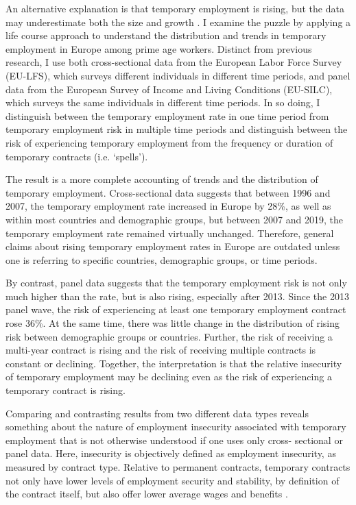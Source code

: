 \documentclass[12pt]{article}
\begin{document}
An alternative explanation is that temporary employment is rising, but the data may underestimate both the size and growth \citep{howell_kalleberg_2019}.  I examine the puzzle by applying a life course approach to understand the distribution and trends in temporary employment in Europe among prime age workers.  Distinct from previous research, I use both cross-sectional data from the European Labor Force Survey (EU-LFS), which surveys different individuals in different time periods, and panel data from the European Survey of Income and Living Conditions (EU-SILC), which surveys the same individuals in different time periods.  In so doing, I distinguish between the temporary employment rate in one time period from temporary employment risk in multiple time periods and distinguish between the risk of experiencing temporary employment from the frequency or duration of temporary contracts (i.e. `spells').  

The result is a more complete accounting of trends and the distribution of temporary employment.  Cross-sectional data suggests that between 1996 and 2007, the temporary employment rate increased in Europe by 28\%, as well as within most countries and demographic groups, but between 2007 and 2019, the temporary employment rate remained virtually unchanged.  Therefore, general claims about rising temporary employment rates in Europe are outdated unless one is referring to specific countries, demographic groups, or time periods.  

By contrast, panel data suggests that the temporary employment risk is not only much higher than the rate, but is also rising, especially after 2013.  Since the 2013 panel wave, the risk of experiencing at least one temporary employment contract rose 36\%.  At the same time, there was little change in the distribution of rising risk between demographic groups or countries.  Further, the risk of receiving a multi-year contract is rising and the risk of receiving multiple contracts is constant or declining.  Together, the interpretation is that the relative insecurity of temporary employment may be declining even as the risk of experiencing a temporary contract is rising.

Comparing and contrasting results from two different data types reveals something about the nature of employment insecurity associated with temporary employment that is not otherwise understood if one uses only cross- sectional or panel data.  Here, insecurity is objectively defined as employment insecurity, as measured by contract type.  Relative to permanent contracts, temporary contracts not only have lower levels of employment security and stability, by definition of the contract itself, but also offer lower average wages and benefits \citep[ch. 4]{eurofund_2015}.  
\end{document}
